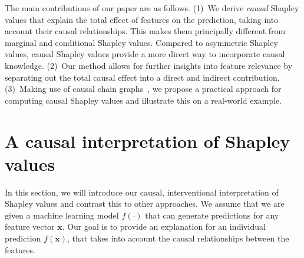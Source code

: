 \documentclass{article}
\newcommand{\vx}{\mathbf{x}}
\newcommand{\expectation}{\mathbb{E}}
\begin{document}
The main contributions of our paper are as follows.
(1)~We derive {\em causal} Shapley values that explain the total effect of features on the prediction, taking into account their causal relationships. This makes them principally different from marginal and conditional Shapley values. Compared to asymmetric Shapley values, causal Shapley values provide a more direct way to incorporate causal knowledge. (2)~Our method allows for further insights into feature relevance by separating out the total causal effect into a direct and indirect contribution. 
(3)~Making use of causal chain graphs~\cite{lauritzen2002chain}, we propose a practical approach for computing causal Shapley values and illustrate this on a real-world example.

\section{A causal interpretation of Shapley values}
\label{sec:interpretation}

In this section, we will introduce our causal, interventional interpretation of Shapley values and contrast this to other approaches.
We assume that we are given a machine learning model $f(\cdot)$ that can generate predictions for any feature vector $\vx$. Our goal is to provide an explanation for an individual prediction $f(\vx)$, that takes into account the causal relationships between the features.
\end{document}
